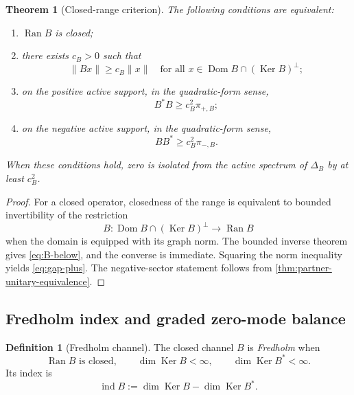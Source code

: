 \documentclass[11pt,reqno]{scrartcl}
\newcommand{\DeltaB}{\Delta}
\DeclareMathOperator{\Dom}{Dom}
\DeclareMathOperator{\Ran}{Ran}
\DeclareMathOperator{\Ker}{Ker}
\DeclareMathOperator{\ind}{ind}
\theoremstyle{plain}
\newtheorem{theorem}{Theorem}[section]
\theoremstyle{definition}
\newtheorem{definition}[definition]{Definition}
\theoremstyle{remark}
\begin{document}
\begin{theorem}[Closed-range criterion]
\label{thm:closed-range-criterion}
The following conditions are equivalent:
\begin{enumerate}[label=\textup{(\roman*)}]
  \item \(\Ran B\) is closed;
  \item there exists \(c_B>0\) such that
  \begin{equation}
    \|Bx\|\ge c_B\|x\|
    \quad
    \text{for all }x\in\Dom B\cap(\Ker B)^\perp;
    \label{eq:B-below}
  \end{equation}
  \item on the positive active support, in the quadratic-form sense,
  \begin{equation}
    B^*B\ge c_B^2\pi_{+,B};
    \label{eq:gap-plus}
  \end{equation}
  \item on the negative active support, in the quadratic-form sense,
  \begin{equation}
    BB^*\ge c_B^2\pi_{-,B}.
    \label{eq:gap-minus}
  \end{equation}
\end{enumerate}
When these conditions hold, zero is isolated from the active spectrum of
\(\DeltaB_B\) by at least \(c_B^2\).
\end{theorem}

\begin{proof}
For a closed operator, closedness of the range is equivalent to bounded
invertibility of the restriction
\begin{equation}
  B:\Dom B\cap(\Ker B)^\perp\longrightarrow\Ran B
\end{equation}
when the domain is equipped with its graph norm.  The bounded inverse theorem
gives \eqref{eq:B-below}, and the converse is immediate.  Squaring the norm
inequality yields \eqref{eq:gap-plus}.  The negative-sector statement follows
from \cref{thm:partner-unitary-equivalence}.
\end{proof}

\subsection{Fredholm index and graded zero-mode balance}

\begin{definition}[Fredholm channel]
\label{def:Fredholm-channel}
The closed channel \(B\) is \emph{Fredholm} when
\begin{equation}
  \Ran B\text{ is closed},
  \qquad
  \dim\Ker B<\infty,
  \qquad
  \dim\Ker B^*<\infty.
\end{equation}
Its index is
\begin{equation}
  \ind B:=\dim\Ker B-\dim\Ker B^*.
  \label{eq:index}
\end{equation}
\end{definition}
\end{document}
